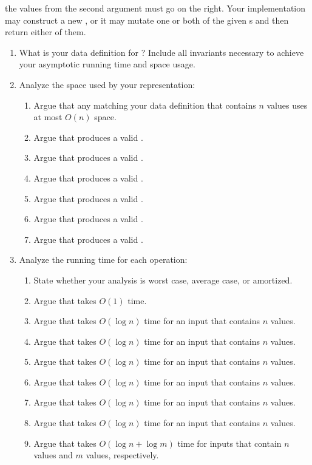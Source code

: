 \documentclass{article}
\begin{document}
\begin{enumerate}
\begin{list}{}
    the values from the second argument must go on the right.
    Your implementation may construct a new \Q{}, or it may mutate one or both
    of the given \Q{}s and then return either of them.
  \end{list}
  \begin{enumerate}
  \item What is your data definition for \Q{}?  Include all invariants
    necessary to achieve your asymptotic running time and space usage.
  \item Analyze the space used by your representation:
    \begin{enumerate}
    \item Argue that any \Q{} matching your data definition that contains
      \(n\) values uses at most \(O(n)\) space.
    \item Argue that  produces a valid \Q{}.
    \item Argue that  produces a valid \Q{}.
    \item Argue that  produces a valid \Q{}.
    \item Argue that  produces a valid \Q{}.
    \item Argue that  produces a valid \Q{}.
    \item Argue that  produces a valid \Q{}.
    \end{enumerate}
  \item Analyze the running time for each operation:
    \begin{enumerate}
    \item State whether your analysis is worst case, average case, or
      amortized.
    \item Argue that  takes \(O(1)\) time.
    \item Argue that  takes \(O(\log n)\) time for an
      input that contains \(n\) values.
    \item Argue that  takes \(O(\log n)\) time for an
      input that contains \(n\) values.
    \item Argue that  takes \(O(\log n)\) time for an
      input that contains \(n\) values.
    \item Argue that  takes \(O(\log n)\) time for an
      input that contains \(n\) values.
    \item Argue that  takes \(O(\log n)\) time for an
      input that contains \(n\) values.
    \item Argue that  takes \(O(\log n)\) time for an
      input that contains \(n\) values.
    \item Argue that  takes \(O(\log n + \log m)\) time for
      inputs that contain \(n\) values and \(m\) values, respectively.
    \end{enumerate}
  \end{enumerate}

\end{enumerate}
\end{document}
